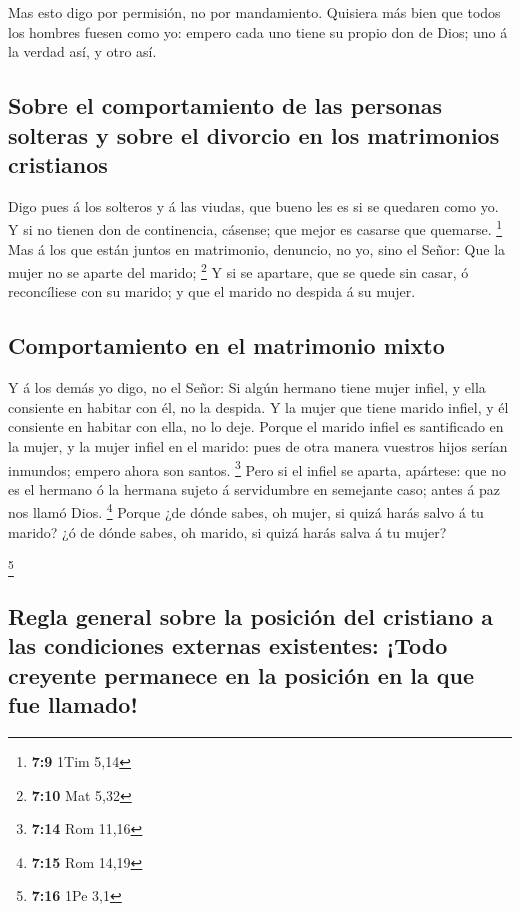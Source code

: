  Mas esto digo por permisión, no por mandamiento.
 Quisiera más bien que todos los hombres fuesen como yo:
empero cada uno tiene su propio don de Dios; uno á la verdad así, y otro
así.

\hypertarget{sobre-el-comportamiento-de-las-personas-solteras-y-sobre-el-divorcio-en-los-matrimonios-cristianos}{%
\subsection{Sobre el comportamiento de las personas solteras y sobre el
divorcio en los matrimonios
cristianos}\label{sobre-el-comportamiento-de-las-personas-solteras-y-sobre-el-divorcio-en-los-matrimonios-cristianos}}

 Digo pues á los solteros y á las viudas, que bueno les es
si se quedaren como yo.  Y si no tienen don de continencia,
cásense; que mejor es casarse que quemarse. \footnote{\textbf{7:9} 1Tim
  5,14}  Mas á los que están juntos en matrimonio,
denuncio, no yo, sino el Señor: Que la mujer no se aparte del marido;
\footnote{\textbf{7:10} Mat 5,32}  Y si se apartare, que se
quede sin casar, ó reconcíliese con su marido; y que el marido no
despida á su mujer.

\hypertarget{comportamiento-en-el-matrimonio-mixto}{%
\subsection{Comportamiento en el matrimonio
mixto}\label{comportamiento-en-el-matrimonio-mixto}}

 Y á los demás yo digo, no el Señor: Si algún hermano tiene
mujer infiel, y ella consiente en habitar con él, no la despida.
 Y la mujer que tiene marido infiel, y él consiente en
habitar con ella, no lo deje.  Porque el marido infiel es
santificado en la mujer, y la mujer infiel en el marido: pues de otra
manera vuestros hijos serían inmundos; empero ahora son santos.
\footnote{\textbf{7:14} Rom 11,16}  Pero si el infiel se
aparta, apártese: que no es el hermano ó la hermana sujeto á servidumbre
en semejante caso; antes á paz nos llamó Dios. \footnote{\textbf{7:15}
  Rom 14,19}  Porque ¿de dónde sabes, oh mujer, si quizá
harás salvo á tu marido? ¿ó de dónde sabes, oh marido, si quizá harás
salva á tu mujer?

\footnote{\textbf{7:16} 1Pe 3,1}

\hypertarget{regla-general-sobre-la-posiciuxf3n-del-cristiano-a-las-condiciones-externas-existentes-todo-creyente-permanece-en-la-posiciuxf3n-en-la-que-fue-llamado}{%
\subsection{Regla general sobre la posición del cristiano a las
condiciones externas existentes: ¡Todo creyente permanece en la posición
en la que fue
llamado!}\label{regla-general-sobre-la-posiciuxf3n-del-cristiano-a-las-condiciones-externas-existentes-todo-creyente-permanece-en-la-posiciuxf3n-en-la-que-fue-llamado}}

